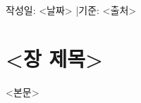 \documentclass[11pt,a4paper]{article}
\begin{document}
\begin{center}
  {\sffamily\LARGE\bfseries <문서 제목>\par}
  \vspace{0.8em}
  {\small 작성일: <날짜> \quad|\quad 기준: <출처>\par}
\end{center}

\section{<장 제목>}
<본문>
\end{document}
